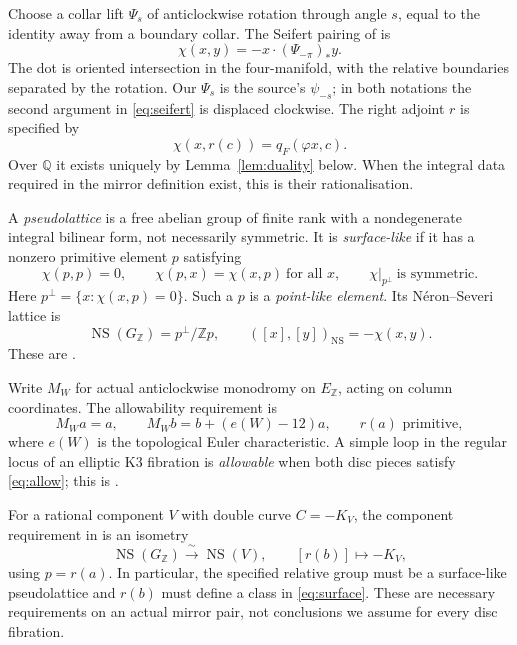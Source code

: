 \documentclass[11pt]{article}
\theoremstyle{definition}
\theoremstyle{remark}
\newcommand{\Z}{\mathbb Z}
\newcommand{\Q}{\mathbb Q}
\newcommand{\NS}{\operatorname{NS}}
\begin{document}
Choose a collar lift $\Psi_s$ of anticlockwise rotation through angle $s$, equal to the identity away from a boundary collar. The Seifert pairing of \cite[Definition~4.1]{GT} is
\begin{equation}\label{eq:seifert}
\chi(x,y)=-x\mathbin{\cdot}(\Psi_{-\pi})_*y.
\end{equation}
The dot is oriented intersection in the four-manifold, with the relative boundaries separated by the rotation. Our $\Psi_s$ is the source's $\psi_{-s}$; in both notations the second argument in \eqref{eq:seifert} is displaced clockwise. The right adjoint $r$ is specified by
\begin{equation}\label{eq:adjoint}
\chi(x,r(c))=q_F(\varphi x,c).
\end{equation}
Over $\Q$ it exists uniquely by Lemma~\ref{lem:duality} below. When the integral data required in the mirror definition exist, this is their rationalisation.

A \emph{pseudolattice} is a free abelian group of finite rank with a nondegenerate integral bilinear form, not necessarily symmetric. It is \emph{surface-like} if it has a nonzero primitive element $p$ satisfying
\[
\chi(p,p)=0,\qquad \chi(p,x)=\chi(x,p)\ \text{for all }x,
\qquad \chi|_{p^\perp}\ \text{is symmetric}.
\]
Here $p^\perp=\{x:\chi(x,p)=0\}$. Such a $p$ is a \emph{point-like element}. Its N\'eron--Severi lattice is
\begin{equation}\label{eq:surface}
\NS(G_{\Z})=p^\perp/\Z p,\qquad
([x],[y])_{\NS}=-\chi(x,y).
\end{equation}
These are \cite[Definitions~2.5--2.6]{GT}.

Write $M_W$ for actual anticlockwise monodromy on $E_{\Z}$, acting on column coordinates. The allowability requirement is
\begin{equation}\label{eq:allow}
M_Wa=a,\qquad M_Wb=b+(e(W)-12)a,\qquad r(a)\text{ primitive},
\end{equation}
where $e(W)$ is the topological Euler characteristic. A simple loop in the regular locus of an elliptic K3 fibration is \emph{allowable} when both disc pieces satisfy \eqref{eq:allow}; this is \cite[Assumption~4.9 and Definition~4.11]{GT}.

For a rational component $V$ with double curve $C=-K_V$, the component requirement in \cite[Definition~5.1(2)]{GT} is an isometry
\begin{equation}\label{eq:component}
\NS(G_{\Z})\xrightarrow{\ \sim\ }\NS(V),\qquad [r(b)]\longmapsto -K_V,
\end{equation}
using $p=r(a)$. In particular, the specified relative group must be a surface-like pseudolattice and $r(b)$ must define a class in \eqref{eq:surface}. These are necessary requirements on an actual mirror pair, not conclusions we assume for every disc fibration.
\end{document}
